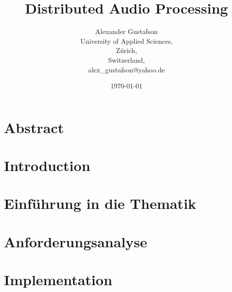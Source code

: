 \documentclass{report}
\begin{document}
\title{Distributed Audio Processing}
\author{Alexander Gustafson\\
  University of Applied Sciences,\\
  Zürich,\\
  Switzerland,\\
  alex\_gustafson@yahoo.de}
\date{\today}
\maketitle

\chapter*{Abstract}



\tableofcontents

\chapter{Introduction}



\chapter{Einführung in die Thematik}






\chapter{Anforderungsanalyse}







\chapter{Implementation}











\end{document}
